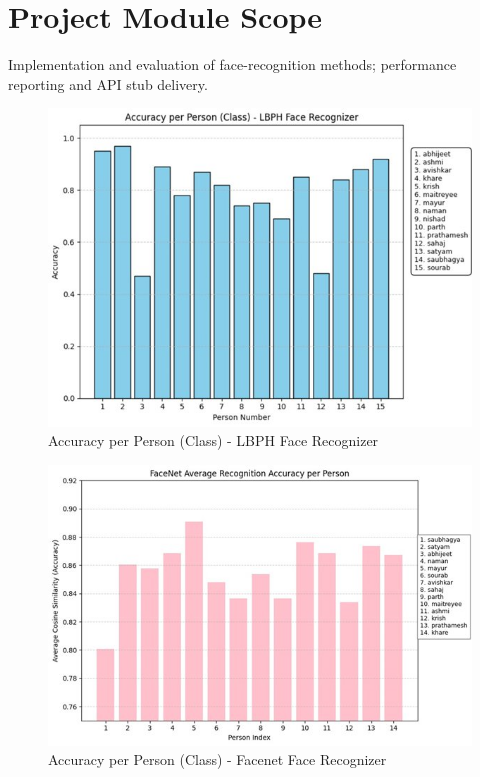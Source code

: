 \documentclass[openany]{report}
\begin{document}
\section{Project Module Scope}
Implementation and evaluation of face-recognition methods; performance reporting and API stub delivery.

\begin{figure}[H]
  \centering
  \includegraphics[width=.95\textwidth]{../imgs/model_1_per_person.jpg}
  \caption{Accuracy per Person (Class) - LBPH Face Recognizer}
\end{figure}


\begin{figure}[H]
  \centering
  \includegraphics[width=.95\textwidth]{../imgs/model_2_per_person.jpg}
  \caption{Accuracy per Person (Class) - Facenet Face Recognizer}
\end{figure}
\end{document}
